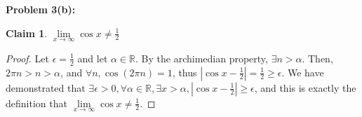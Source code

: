 \documentclass{article}
\newcommand{\reals}{\ensuremath{\mathbb{R}}}
\newcommand{\eps}{\ensuremath{\epsilon}}
\newcommand{\limf}[1]{\ensuremath{\underset{x\to #1 }{\lim}}}
\newtheorem{clm}{Claim}
\begin{document}
\textbf{Problem 3(b):}

\begin{clm}
	$\limf{\infty} \cos x \neq \frac{1}{2}$
\end{clm}

\begin{proof}
	Let $\eps = \frac{1}{2}$ and let $\alpha \in \reals$.
	By the archimedian property,
	$\exists n > \alpha$.
	Then, $2\pi n > n > \alpha$,
	and $\forall n, \cos (2\pi n) = 1$,
	thus $|\cos x - \frac{1}{2}| = \frac{1}{2} \geq \eps$.
	We have demonstrated that
	$\exists \eps > 0,
	\forall \alpha \in \reals,
	\exists x > \alpha,
	|\cos x - \frac{1}{2}| \geq \eps$,
	and this is exactly the definition that
	$\limf{\infty} \cos x \neq \frac{1}{2}$.
\end{proof}
\end{document}
